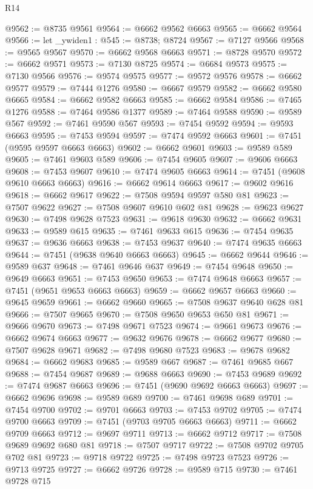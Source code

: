 \begin{lexlean}{R14}
\begin{coremodule}
@9562 := @8735 @9561
@9564 := @6662 @9562 @6663
@9565 := @6662 @9564
@9566 := let _ywiden1 : @545 := @8738; @8724
@9567 := @7127 @9566
@9568 := @9565 @9567
@9570 := @6662 @9568 @6663
@9571 := @8728 @9570
@9572 := @6662 @9571
@9573 := @7130 @8725
@9574 := @6684 @9573
@9575 := @7130 @9566
@9576 := @9574 @9575
@9577 := @9572 @9576
@9578 := @6662 @9577
@9579 := @7444 @1276
@9580 := @6667 @9579
@9582 := @6662 @9580 @6665
@9584 := @6662 @9582 @6663
@9585 := @6662 @9584
@9586 := @7465 @1276
@9588 := @7464 @9586 @1377
@9589 := @7464 @9588
@9590 := @9589 @567
@9592 := @7461 @9590 @567
@9593 := @7454 @9592
@9594 := @9593 @6663
@9595 := @7453 @9594
@9597 := @7474 @9592 @6663
@9601 := @7451 (@9595 @9597 @6663 @6663)
@9602 := @6662 @9601
@9603 := @9589 @589
@9605 := @7461 @9603 @589
@9606 := @7454 @9605
@9607 := @9606 @6663
@9608 := @7453 @9607
@9610 := @7474 @9605 @6663
@9614 := @7451 (@9608 @9610 @6663 @6663)
@9616 := @6662 @9614 @6663
@9617 := @9602 @9616
@9618 := @6662 @9617
@9622 := @7508 @9594 @9597 @580 @81
@9623 := @7507 @9622
@9627 := @7508 @9607 @9610 @602 @81
@9628 := @9623 @9627
@9630 := @7498 @9628 @7523
@9631 := @9618 @9630
@9632 := @6662 @9631
@9633 := @9589 @615
@9635 := @7461 @9633 @615
@9636 := @7454 @9635
@9637 := @9636 @6663
@9638 := @7453 @9637
@9640 := @7474 @9635 @6663
@9644 := @7451 (@9638 @9640 @6663 @6663)
@9645 := @6662 @9644
@9646 := @9589 @637
@9648 := @7461 @9646 @637
@9649 := @7454 @9648
@9650 := @9649 @6663
@9651 := @7453 @9650
@9653 := @7474 @9648 @6663
@9657 := @7451 (@9651 @9653 @6663 @6663)
@9659 := @6662 @9657 @6663
@9660 := @9645 @9659
@9661 := @6662 @9660
@9665 := @7508 @9637 @9640 @628 @81
@9666 := @7507 @9665
@9670 := @7508 @9650 @9653 @650 @81
@9671 := @9666 @9670
@9673 := @7498 @9671 @7523
@9674 := @9661 @9673
@9676 := @6662 @9674 @6663
@9677 := @9632 @9676
@9678 := @6662 @9677
@9680 := @7507 @9628 @9671
@9682 := @7498 @9680 @7523
@9683 := @9678 @9682
@9684 := @6662 @9683
@9685 := @9589 @667
@9687 := @7461 @9685 @667
@9688 := @7454 @9687
@9689 := @9688 @6663
@9690 := @7453 @9689
@9692 := @7474 @9687 @6663
@9696 := @7451 (@9690 @9692 @6663 @6663)
@9697 := @6662 @9696
@9698 := @9589 @689
@9700 := @7461 @9698 @689
@9701 := @7454 @9700
@9702 := @9701 @6663
@9703 := @7453 @9702
@9705 := @7474 @9700 @6663
@9709 := @7451 (@9703 @9705 @6663 @6663)
@9711 := @6662 @9709 @6663
@9712 := @9697 @9711
@9713 := @6662 @9712
@9717 := @7508 @9689 @9692 @680 @81
@9718 := @7507 @9717
@9722 := @7508 @9702 @9705 @702 @81
@9723 := @9718 @9722
@9725 := @7498 @9723 @7523
@9726 := @9713 @9725
@9727 := @6662 @9726
@9728 := @9589 @715
@9730 := @7461 @9728 @715

\end{coremodule}
\end{lexlean}
